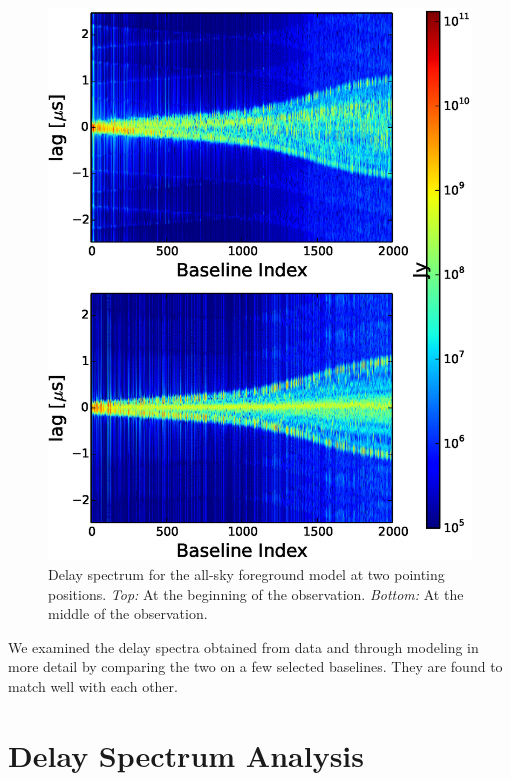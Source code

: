 \documentclass[preprint2,iop,numberedappendix]{emulateapj}
\begin{document}
\begin{figure}[htb]
\centering
\includegraphics[width=\linewidth]{figures/v1_0/multi_combined_baseline_CLEAN_visibilities_contiguous_orientations_custom_gaussian_FG_model_asm_all_sky_nside_128_185.0_MHz_30.7_MHz_bnw2.0_2_snapshots.eps}
\caption{Delay spectrum for the all-sky foreground model at two pointing positions. {\it Top:} At the beginning of the observation. {\it Bottom:} At the middle of the observation. \label{fig:obsids}}
\end{figure}

We examined the delay spectra obtained from data and through modeling in more detail by comparing the two on a few selected baselines. They are found to match  well with each other.

\section{Delay Spectrum Analysis}\label{sec:delay-spectrum-analysis}
\end{document}
